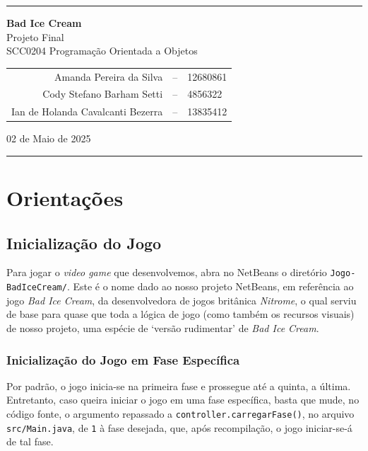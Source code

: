 \documentclass[10pt,a4paper,portuguese]{article}
\begin{document}
    \vspace{5mm}
    \rule{0.95\textwidth}{1pt}
    \vspace{3mm}
    \begin{center}
        \textbf{\huge Bad Ice Cream} \\
        \Large Projeto Final \\
        \large SCC0204 Programação Orientada a Objetos
    
        \vspace{8mm}
        \begin{tabular}{rcl}
            Amanda Pereira da Silva &-- &12680861 \\
            Cody Stefano Barham Setti &-- &4856322 \\
            Ian de Holanda Cavalcanti Bezerra &-- &13835412
        \end{tabular}

    \vspace{8mm}
    02 de Maio de 2025
    \end{center}

    \vspace{1mm}
    \rule{0.95\textwidth}{1pt}
    \vspace{0.5cm}

    \section{Orientações}
    \subsection{Inicialização do Jogo}
        Para jogar o \emph{video game} que desenvolvemos, abra no NetBeans o diretório \verb|Jogo-BadIceCream/|. Este é o nome dado ao nosso projeto NetBeans, em referência ao jogo \emph{Bad Ice Cream}, da desenvolvedora de jogos britânica \emph{Nitrome}, o qual serviu de base para quase que toda a lógica de jogo (como também os recursos visuais) de nosso projeto, uma espécie de `versão rudimentar' de \emph{Bad Ice Cream}.

    \subsubsection{Inicialização do Jogo em Fase Específica}
        Por padrão, o jogo inicia-se na primeira fase e prossegue até a quinta, a última. Entretanto, caso queira iniciar o jogo em uma fase específica, basta que mude, no código fonte, o argumento repassado a \verb|controller.carregarFase()|, no arquivo \verb|src/Main.java|, de \verb|1| à fase desejada, que, após recompilação, o jogo iniciar-se-á de tal fase.
        
\end{document}
